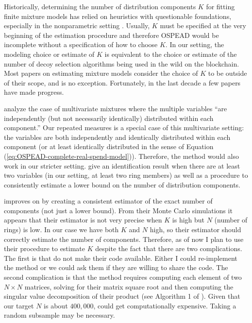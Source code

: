 \documentclass[english]{article}
\begin{document}
Historically, determining the number of distribution components $K$
for fitting finite mixture models has relied on heuristics with questionable
foundations, especially in the nonparametric setting \cite{mclachlan2000finite}.
Usually, $K$ must be specified at the very beginning of the estimation
procedure and therefore OSPEAD would be incomplete without a specification
of how to choose $K$. In our setting, the modeling choice or estimate
of $K$ is equivalent to the choice or estimate of the number of decoy
selection algorithms being used in the wild on the blockchain. Most
papers on estimating mixture models consider the choice of $K$ to
be outside of their scope, and \cite{Bonhomme2016} is no exception.
Fortunately, in the last decade a few papers have made progress.

\cite{KasaharaShimotsu2014} analyze the case of multivariate mixtures
where the multiple variables ``are independently (but not necessarily
identically) distributed within each component.'' Our repeated measures
is a special case of this multivariate setting: the variables are
both independently and identically distributed within each component
(or at least identically distributed in the sense of Equation (\ref{eq:OSPEAD-complete-real-spend-model})).
Therefore, the \cite{KasaharaShimotsu2014} method would also work
in our stricter setting. \cite{KasaharaShimotsu2014} give an identification
result when there are at least two variables (in our setting, at least
two ring members) as well as a procedure to consistently estimate
a lower bound on the number of distribution components.

\cite{KwonMbakop2021} improves on \cite{KasaharaShimotsu2014} by
creating a consistent estimator of the exact number of components
(not just a lower bound). From their Monte Carlo simulations it appears
that their estimator is not very precise when $K$ is high but $N$
(number of rings) is low. In our case we have both $K$ and $N$ high,
so their estimator should correctly estimate the number of components.
Therefore, as of now I plan to use their procedure to estimate $K$
despite the fact that there are two complications. The first is that
\cite{KwonMbakop2021} do not make their code available. Either I
could re-implement the method or we could ask them if they are willing
to share the code. The second complication is that the method requires
computing each element of two $N\times N$ matrices, solving for their
matrix square root and then computing the singular value decomposition
of their product (see Algorithm 1 of \cite{KwonMbakop2021}). Given
that our target $N$ is about $400,000$, \cite{KwonMbakop2021} could
get computationally expensive. Taking a random subsample may be necessary.
\end{document}
